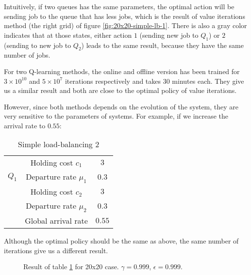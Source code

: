 \documentclass[
  a4paper, xcolor = usenames,dvipsnames]{article}
\theoremstyle{definition}
\theoremstyle{definition}
\theoremstyle{definition}
\theoremstyle{definition}
\theoremstyle{remark}
\begin{document}
Intuitively, if two queues has the same parameters, the optimal action will be sending job to the queue that has less jobs, which is the result of value iterations method (the right grid) of figure \ref{fig:20x20-simple-lb-1}. There is also a gray color indicates that at those states, either action \(1\) (sending new job to \(Q_{1}\)) or \(2\) (sending to new job to \(Q_{2}\)) leads to the same result, because they have the same number of jobs.

For two Q-learning methods, the online and offline version has been trained for \(3 \times 10^{10}\) and \(5 \times 10^{7}\) iterations respectively and takes 30 minutes each. They give us a similar result and both are close to the optimal policy of value iterations.

However, since both methods depends on the evolution of the system, they are very sensitive to the parameters of systems. For example, if we increase the arrival rate to \(0.55\):

\begin{table}[!htbp]
\caption{Simple load-balancing 2}
\begin{center}
\begin{tabular}{c c c}
    \hline
    \multirow{3}{*}{$Q_{1}$} & Holding cost $c_{1}$ & $3$ \\
    & Departure rate $\mu_{1}$ & $0.3$ \\
    \cline{2-3}
    \multirow{3}{*}{$Q_{2}$} & Holding cost $c_{2}$ & $3$ \\
    & Departure rate $\mu_{2}$ & $0.3$ \\
    \cline{2-3}
    & Global arrival rate & $0.55$ \\    
    \hline
\end{tabular}
\end{center}
\label{tab:simple-lb-2}
\end{table}

Although the optimal policy should be the same as above, the same number of iterations give us a different result.



\begin{figure}

{\centering {}

}

\caption{Result of table \ref{tab:simple-lb-2} for 20x20 case. \(\gamma = 0.999\), \(\epsilon = 0.999\).}\label{fig:20x20-simple-lb-2}
\end{figure}
\end{document}
